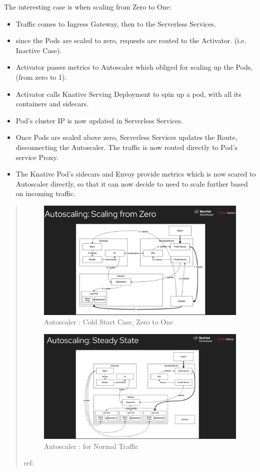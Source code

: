 \documentclass[12pt]{article}
\begin{document}
\begin{flushleft}
The interesting case is when scaling from Zero to One:
\begin{itemize}
\item  Traffic comes to Ingress Gateway, then to the Serverless Services.
\item since the Pods are scaled to zero, requests are routed to the Activator. (i.e. Inactive Case).
\item Activator passes metrics to Autoscaler which obliged for scaling up the Pods, (from zero to 1).
\item Activator calls Knative Serving Deployment to spin up a pod, with all its containers and sidecars. 
\item Pod's cluster IP is now updated in Serverless Services.
\item Once Pods are scaled above zero, Serverless Services updates the Route, disconnecting the Autoscaler. The traffic is now routed directly to Pod's service Proxy.
\item The Knative Pod's sidecars and Envoy provide metrics which is now scared to Autoscaler directly, so that it can now decide to need to scale further based on incoming traffic.
\end{itemize}
\begin{quote}
    \begin{figure}[h]
    \centering
    \includegraphics[width=0.5\linewidth]
    {images/KnativeAutoscaler-1.PNG}
    \caption{Autoscaler : Cold Start Case, Zero to One}
\end{figure}
\begin{figure}[h]
    \centering
    \includegraphics[width=0.5\linewidth]{images/KnativeAutoscaler-2.PNG}
    \caption{Autoscaler : for Normal Traffic }
\end{figure}
\begin{flushright} ref: \textit{\cite{Morie_2020}} \end{flushright}
\end{quote}


\end{flushleft}
\end{document}
